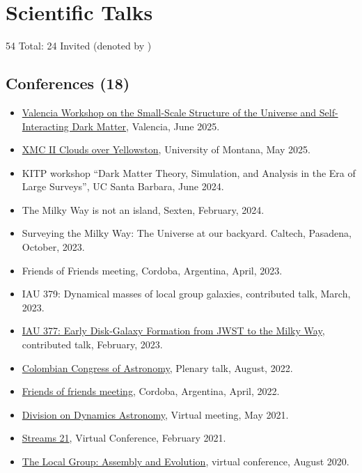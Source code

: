 \documentclass[14pt]{article}
\begin{document}
\section*{Scientific Talks}

54 Total: 24 Invited (denoted by \dag)\\


\subsection*{Conferences (18)}

\begin{itemize}
  \setlength\itemsep{0.0em}
  \renewcommand\labelitemi{$\cdot$}
\item \href{https://indico.ific.uv.es/event/7815/}{Valencia Workshop on the Small-Scale Structure of the Universe
    and Self-Interacting Dark Matter}, Valencia, June 2025.
\item \href{https://sites.google.com/view/xmciiworkshop/home}{XMC II Clouds over Yellowston}, University of Montana, May 2025.
\item KITP workshop ``Dark Matter Theory, Simulation, and Analysis in the Era of Large Surveys'', UC Santa Barbara, June 2024. \dag
\item The Milky Way is not an island, Sexten, February, 2024. 
\item Surveying the Milky Way: The Universe at our backyard. Caltech,
  Pasadena, October, 2023.
\item Friends of Friends meeting, Cordoba, Argentina, April, 2023. \dag
\item IAU 379: Dynamical masses of local group galaxies, contributed talk, March, 2023.
\item \href{https://www.mso.anu.edu.au/~yting/Malaysia_IAU/}{IAU 377: Early Disk-Galaxy Formation
from JWST to the Milky Way}, contributed talk, February, 2023.
\item \href{https://accefyn.com/microsites/nodos/astroco/congreso-colombiano-de-astronomia-cocoa-2022%E2%80%8B/}{Colombian Congress of Astronomy}, Plenary talk, August, 2022. \dag
\item \href{http://fof.oac.uncor.edu/2022/}{Friends of friends meeting}, Cordoba, Argentina, April, 2022.
\item \href{https://aas.org/meetings/dda52}{Division on Dynamics Astronomy}, Virtual meeting, May 2021.
\item \href{https://stellarstreams.org/streams21/}{Streams 21}, Virtual
  Conference, February 2021. 
\item  \href{https://www.stsci.edu/contents/events/stsci/2020/april/the-local-group-assembly-and-evolution?page=2&filterUUID=6fedb8a7-}{The Local Group: Assembly and Evolution}, virtual conference, August 2020.

\end{itemize}
\end{document}
